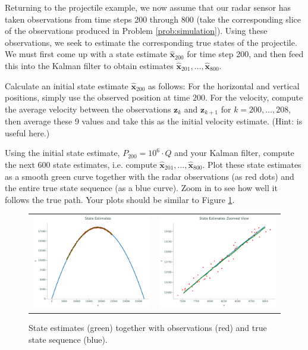 Returning to the projectile example, we now assume that our radar sensor has taken observations from time steps 200 through 800 (take the corresponding slice of the observations produced in Problem \ref{prob:simulation}).
Using these observations, we seek to estimate the corresponding true states of the projectile.
We must first come up with a state estimate $\widehat{\mathbf{x}}_{200}$ for time step 200, and then feed this into the Kalman filter to obtain estimates $\widehat{\mathbf{x}}_{201}, \ldots, \widehat{\mathbf{x}}_{800}$.
\begin{problem}
Calculate an initial state estimate $\widehat{\mathbf{x}}_{200}$ as follows:
For the horizontal and vertical positions, simply use the observed position at time $200$.
For the velocity, compute the average velocity between the observations $\mathbf{z}_k$ and $\mathbf{z}_{k+1}$ for $k = 200,\ldots,208$, then average these 9 values and take this as the initial velocity estimate.
(Hint:  is useful here.)

Using the initial state estimate, $P_{200} = 10^{6} \cdot Q$ and your Kalman filter, compute the next 600 state estimates, i.e. compute $\widehat{\mathbf{x}}_{201}, \ldots, \widehat{\mathbf{x}}_{800}$.
Plot these state estimates as a smooth green curve together with the radar observations (as red dots) and the entire true state sequence (as a blue curve).
Zoom in to see how well it follows the true path. Your plots should be similar to Figure \ref{fig:estimates}.
\label{prob:state_estimate}
\end{problem}

\begin{figure}
    \centering
    \begin{tabular}{cc}
    \includegraphics[width=.45\textwidth]{figures/estimate_macro} &
    \includegraphics[width=.45\textwidth]{figures/estimate_micro}
    \end{tabular}
    \caption{State estimates (green) together with observations (red) and true state sequence (blue).}
    \label{fig:estimates}
\end{figure}


